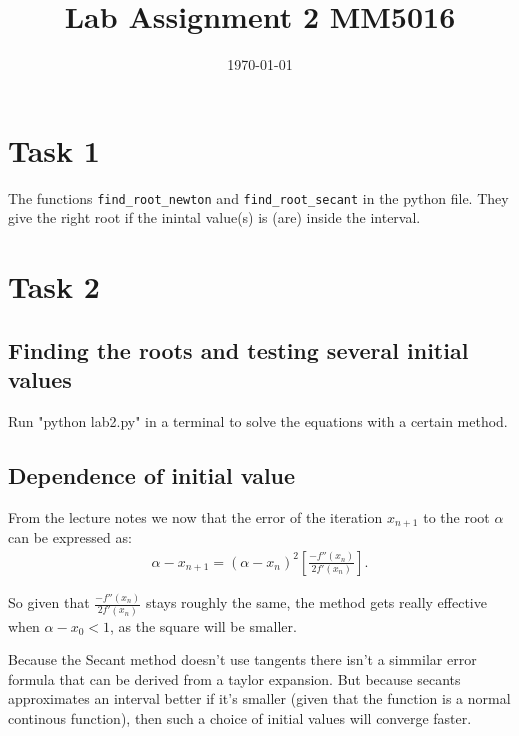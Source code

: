 \documentclass[12pt]{article}
\date{\today}
\title{Lab Assignment 2 MM5016}
\begin{document}
\maketitle

\section*{Task 1}
\label{sec:org57d1514}

The functions \texttt{find\_root\_newton} and \texttt{find\_root\_secant} in the python file. They give
the right root if the inintal value(s) is (are) inside the interval.

\section*{Task 2}
\label{sec:orgc290f2f}
\subsection*{Finding the roots and testing several initial values}
\label{sec:orgc327088}
Run "python lab2.py" in a terminal to solve the equations with a certain method.
\subsection*{Dependence of initial value}
\label{sec:org37eed1b}
From the lecture notes we now that the error of the iteration
\(x _{n+1}\) to the root \(\alpha\) can be expressed as:
\begin{align*}
\alpha - x _{n+1} = (\alpha - x_n ) ^2 [\frac{-f''(x_n)}{2f'(x_n)}] 
.
\end{align*}

So given that \(\frac{-f''(x_n)}{2f'(x_n)}\) stays roughly the same, the method gets really effective when \(\alpha - x_0 < 1\), as the square will be smaller.


Because the Secant method doesn't use tangents there isn't a simmilar error formula that
can be derived from a taylor expansion. But because secants approximates an interval
better if it's smaller (given that the function is a normal continous function), then such
a choice of initial values will converge faster.
\end{document}
